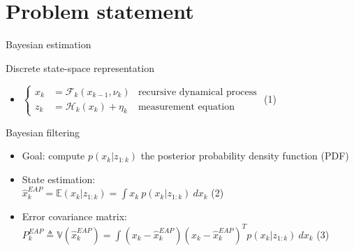 \documentclass[9pt]{beamer}
\begin{document}
\section{Problem statement}

\begin{frame}{Bayesian estimation}

\begin{block}{Discrete state-space representation}
\begin{itemize}
\item \hfill $\left\{
\begin{aligned}
x_k & = \mathcal{F}_k(x_{k-1}, \nu_k) & \text{recursive dynamical process} \\
z_k & = \mathcal{H}_k(x_k) + \eta_k & \text{measurement equation}
\end{aligned}
\right.$ \hfill (1)
\end{itemize}
\end{block}

\begin{block}{Bayesian filtering}
\begin{itemize}
\item Goal: compute $p(x_k|z_{1:k})$ the posterior probability density function (PDF)
\item State estimation:\\
\hfill $\displaystyle \hat x_k^{EAP} = \mathbb{E}(x_k|z_{1:k}) = \int x_k \: p(x_k|z_{1:k}) \: dx_k$ \hfill (2)
\item Error covariance matrix:\\
\hfill $\displaystyle P_k^{EAP} \triangleq \mathbb{V}(\hat{x}_k^{EAP}) = \int (x_k - \hat{x}_k^{EAP})(x_k - \hat{x}_k^{EAP})^T p(x_k|z_{1:k}) \: dx_k$ \hfill (3)
\end{itemize}
\end{block}

\end{frame}
\end{document}
